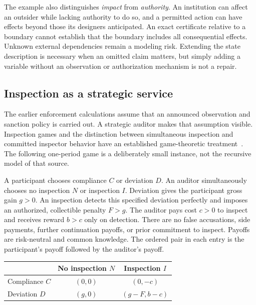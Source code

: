 \documentclass[11pt,letterpaper]{article}
\theoremstyle{plain}
\theoremstyle{definition}
\theoremstyle{remark}
\begin{document}
The example also distinguishes \emph{impact} from \emph{authority}. An institution can affect an outsider while lacking authority to do so, and a permitted action can have effects beyond those its designers anticipated. An exact certificate relative to a boundary cannot establish that the boundary includes all consequential effects. Unknown external dependencies remain a modeling risk. Extending the state description is necessary when an omitted claim matters, but simply adding a variable without an observation or authorization mechanism is not a repair.

\subsection{Inspection as a strategic service}\label{sec:strategic-auditor}

The earlier enforcement calculations assume that an announced observation and sanction policy is carried out. A strategic auditor makes that assumption visible. Inspection games and the distinction between simultaneous inspection and committed inspector behavior have an established game-theoretic treatment~\cite{stengelinspection}. The following one-period game is a deliberately small instance, not the recursive model of that source.

A participant chooses compliance $C$ or deviation $D$. An auditor simultaneously chooses no inspection $N$ or inspection $I$. Deviation gives the participant gross gain $g>0$. An inspection detects this specified deviation perfectly and imposes an authorized, collectible penalty $F>g$. The auditor pays cost $c>0$ to inspect and receives reward $b>c$ only on detection. There are no false accusations, side payments, further continuation payoffs, or prior commitment to inspect. Payoffs are risk-neutral and common knowledge. The ordered pair in each entry is the participant's payoff followed by the auditor's payoff.

\begin{center}
\begin{tabular}{@{}lcc@{}}
\toprule
 & No inspection $N$ & Inspection $I$\\
\midrule
Compliance $C$ & $(0,0)$ & $(0,-c)$\\
Deviation $D$ & $(g,0)$ & $(g-F,b-c)$\\
\bottomrule
\end{tabular}
\end{center}
\end{document}
